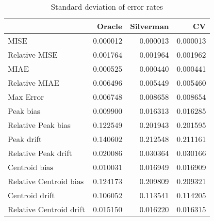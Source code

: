 \begin{table}[H]
\centering
\begin{tabular}{lrrr}
  \hline
 & Oracle & Silverman & CV \\ 
  \hline
MISE & 0.000012 & 0.000013 & 0.000013 \\ 
  Relative MISE & 0.001764 & 0.001964 & 0.001962 \\ 
  MIAE & 0.000525 & 0.000440 & 0.000441 \\ 
  Relative MIAE & 0.006496 & 0.005449 & 0.005460 \\ 
  Max Error & 0.006748 & 0.008658 & 0.008654 \\ 
  Peak bias & 0.009900 & 0.016313 & 0.016285 \\ 
  Relative Peak bias & 0.122549 & 0.201943 & 0.201595 \\ 
  Peak drift & 0.140602 & 0.212548 & 0.211161 \\ 
  Relative Peak drift & 0.020086 & 0.030364 & 0.030166 \\ 
  Centroid bias & 0.010031 & 0.016949 & 0.016909 \\ 
  Relative Centroid bias & 0.124173 & 0.209809 & 0.209321 \\ 
  Centroid drift & 0.106052 & 0.113541 & 0.114205 \\ 
  Relative Centroid drift & 0.015150 & 0.016220 & 0.016315 \\ 
   \hline
\end{tabular}
\caption{Standard deviation of error rates} 
\label{tbl:stddev_error_rates}
\end{table}
